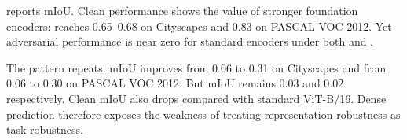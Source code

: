  reports mIoU. Clean performance shows the value of stronger foundation encoders: \DINOv reaches 0.65--0.68 on Cityscapes and 0.83 on PASCAL VOC 2012. Yet adversarial performance is near zero for standard encoders under both \EmbedAttack and \SegPGD.

\begin{table}[t]
    \centering
    \small
    \caption{Semantic segmentation robustness. \DeACL improves \EmbedAttack mIoU, but \SegPGD remains effective.}
    \label{tab:segmentation}
\end{table}

The \DeACL pattern repeats. \EmbedAttack mIoU improves from 0.06 to 0.31 on Cityscapes and from 0.06 to 0.30 on PASCAL VOC 2012. But \SegPGD mIoU remains 0.03 and 0.02 respectively. Clean mIoU also drops compared with standard \DINO ViT-B/16. Dense prediction therefore exposes the weakness of treating representation robustness as task robustness.

